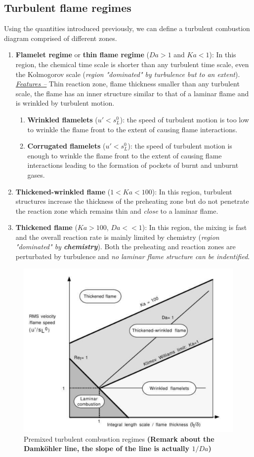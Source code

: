 \documentclass[a4paper,11pt]{article}
\begin{document}
\subsection{Turbulent flame regimes}
Using the quantities introduced previously, we can define a turbulent combustion diagram comprised of different zones.
\begin{enumerate}
	\item \textbf{Flamelet regime} or \textbf{thin flame regime} ($Da>1$ and $Ka<1$): In this region, the chemical time scale is shorter than any turbulent time scale, even the Kolmogorov scale (\textit{region "dominated" by turbulence but to an extent}).\\
	\underline{\textit{Features --}} Thin reaction zone, flame thickness smaller than any turbulent scale, the flame has an inner structure similar to that of a laminar flame and is wrinkled by turbulent motion.
	\begin{enumerate}
		\item \textbf{Wrinkled flamelets} ($u'<s^0_L$): the speed of turbulent motion is too low to wrinkle the flame front to the extent of causing flame interactions. 
		\item \textbf{Corrugated flamelets} ($u'<s^0_L$): the speed of turbulent motion is enough to wrinkle the flame front to the extent of causing flame interactions leading to the formation of pockets of burnt and unburnt gases.
	\end{enumerate}
	\item \textbf{Thickened-wrinkled flame} ($1<Ka<100$): In this region, turbulent structures increase the thickness of the preheating zone but do not penetrate the reaction zone which remains thin and \emph{close} to a laminar flame.
	\item \textbf{Thickened flame} ($Ka>100$, $Da<<1$): In this region, the mixing is fast and the overall reaction rate is mainly limited by chemistry (\textit{region "dominated" by \textbf{chemistry}}). Both the preheating and reaction zones are perturbated by turbulence and \emph{no laminar flame structure can be indentified}.
\end{enumerate}
\begin{figure}[h!]
	\centering
	\includegraphics[width=.7\linewidth]{figures/diagram.png}
	\caption{Premixed turbulent combustion regimes \textbf{(Remark about the Damköhler line, the slope of the line is actually $1/Da$)}}
\end{figure}
\end{document}
